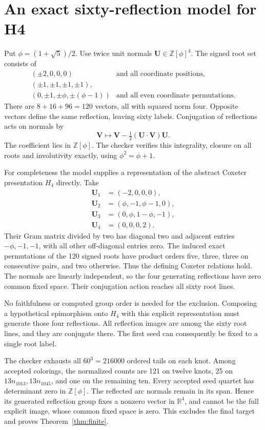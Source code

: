 \documentclass[11pt]{article}
\begin{document}
\section{An exact sixty-reflection model for H4}

Put $\phi=(1+\sqrt5)/2$. Use twice unit normals $\mathbf U\in
\mathbb Z[\phi]^4$. The signed root set consists of
\[
\begin{array}{ll}
(\pm2,0,0,0)&\text{and all coordinate positions},\\
(\pm1,\pm1,\pm1,\pm1),&\\
(0,\pm1,\pm\phi,\pm(\phi-1))&\text{and all even coordinate permutations}.
\end{array}
\]
There are $8+16+96=120$ vectors, all with squared norm four.
Opposite vectors define the same reflection, leaving sixty labels.
Conjugation of reflections acts on normals by
\[
 \mathbf V\longmapsto
 \mathbf V-\tfrac12(\mathbf U\cdot\mathbf V)\mathbf U.
\]
The coefficient lies in $\mathbb Z[\phi]$. The checker verifies this
integrality, closure on all roots and involutivity exactly, using
$\phi^2=\phi+1$.

For completeness the model supplies a representation of the
abstract Coxeter presentation $H_4$ directly. Take
\[
\begin{split}
 \mathbf U_1&=(-2,0,0,0),\\
 \mathbf U_2&=(\phi,-1,\phi-1,0),\\
 \mathbf U_3&=(0,\phi,1-\phi,-1),\\
 \mathbf U_4&=(0,0,0,2).
\end{split}
\]
Their Gram matrix divided by two has diagonal two and adjacent
entries $-\phi,-1,-1$, with all other off-diagonal entries zero.
The induced exact permutations of the 120 signed roots have product
orders five, three, three on consecutive pairs, and two otherwise.
Thus the defining Coxeter relations hold. The normals are linearly
independent, so the four generating reflections have zero common
fixed space. Their conjugation action reaches all sixty root lines.

No faithfulness or computed group order is needed for the exclusion.
Composing a hypothetical epimorphism onto $H_4$ with this explicit
representation must generate those four reflections. All reflection
images are among the sixty root lines, and they are conjugate there.
The first seed can consequently be fixed to a single root label.

The checker exhausts all $60^3=216000$ ordered tails on each knot.
Among accepted colorings, the normalized counts are 121 on twelve
knots, 25 on $13n_{1013},13n_{1045}$, and one on the remaining ten.
Every accepted seed quartet has determinant zero in $\mathbb Z[\phi]$.
The reflected arc normals remain in its span. Hence its generated
reflection group fixes a nonzero vector in $\mathbb R^4$, and cannot
be the full explicit image, whose common fixed space is zero.
This excludes the final target and proves Theorem~\ref{thm:finite}.
\end{document}
